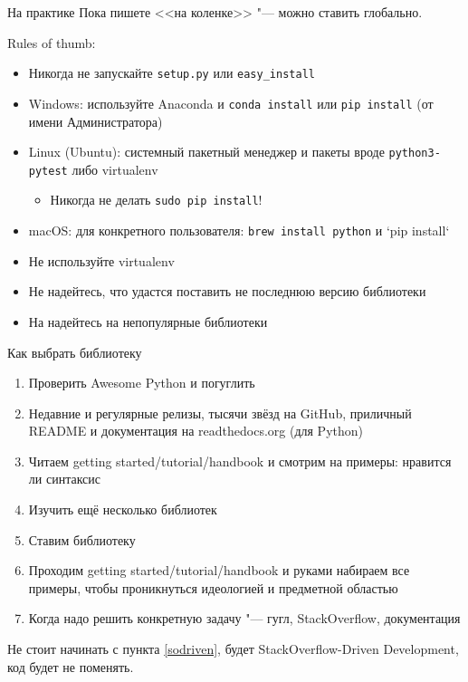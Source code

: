\begin{frame}[t,fragile]{На практике}
	Пока пишете <<на коленке>> "--- можно ставить глобально.
	
	Rules of thumb:
	\begin{itemize}
	\item
		Никогда не запускайте \verb`setup.py` или \verb`easy_install`
	\item Windows: используйте Anaconda и \verb`conda install` или \verb`pip install` (от имени Администратора)
	\item Linux (Ubuntu): системный пакетный менеджер и пакеты вроде \verb`python3-pytest` либо virtualenv
		\begin{itemize}
		\item Никогда не делать \verb`sudo pip install`!
		\end{itemize}
	\item macOS: для конкретного пользователя: \verb`brew install python` и `pip install`
	\item Не используйте virtualenv
	\item Не надейтесь, что удастся поставить не последнюю версию библиотеки
	\item На надейтесь на непопулярные библиотеки
	\end{itemize}
\end{frame}

\begin{frame}[t]{Как выбрать библиотеку}
	\begin{enumerate}
	\item Проверить Awesome Python и погуглить
	\item Недавние и регулярные релизы, тысячи звёзд на GitHub, приличный README и документация на readthedocs.org (для Python)
	\item Читаем getting started/tutorial/handbook и смотрим на примеры: нравится ли синтаксис
	\item Изучить ещё несколько библиотек
	\item Ставим библиотеку
	\item Проходим getting started/tutorial/handbook и руками набираем все примеры, чтобы проникнуться идеологией и предметной областью
	\item Когда надо решить конкретную задачу "--- гугл, StackOverflow, документация\label{sodriven}
	\end{enumerate}
	
	Не стоит начинать с пункта \ref{sodriven}, будет StackOverflow-Driven Development, код будет не поменять.
\end{frame}

